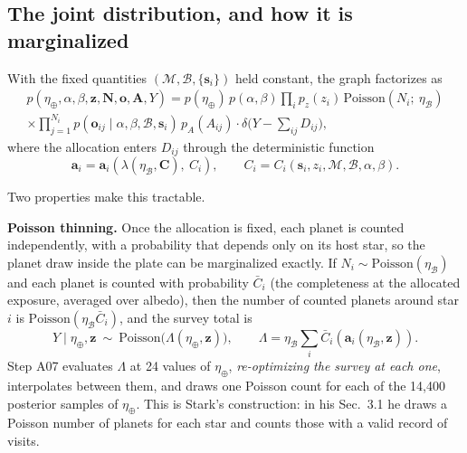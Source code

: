 \documentclass[11pt,a4paper]{article}
\begin{document}
\subsection{The joint distribution, and how it is marginalized}
\label{sec:joint}

With the fixed quantities $(\mathcal{M}, \mathcal{B}, \{\mathbf{s}_i\})$ held constant, the graph
factorizes as
\begin{multline}
p(\eta_\oplus, \alpha, \beta, \mathbf{z}, \mathbf{N}, \mathbf{o}, \mathbf{A}, Y)
= p(\eta_\oplus)\,p(\alpha,\beta)\prod_{i} p_z(z_i)\,
\mathrm{Poisson}\!\left(N_i;\ \eta_\mathcal{B}\right) \\
\times \prod_{j=1}^{N_i} p(\mathbf{o}_{ij} \mid \alpha, \beta, \mathcal{B}, \mathbf{s}_i)\,p_A(A_{ij})
\cdot \delta\!\Big(Y - \sum_{ij} D_{ij}\Big),
\label{eq:joint}
\end{multline}
where the allocation enters $D_{ij}$ through the deterministic function
\begin{equation}
\mathbf{a}_i = \mathbf{a}_i\!\left(\lambda(\eta_\mathcal{B}, \mathbf{C}),\ C_i\right),
\qquad C_i = C_i(\mathbf{s}_i, z_i, \mathcal{M}, \mathcal{B}, \alpha, \beta).
\label{eq:alloc}
\end{equation}

Two properties make this tractable.

\textbf{Poisson thinning.} Once the allocation is fixed, each planet is counted independently,
with a probability that depends only on its host star, so the planet draw inside the plate can be
marginalized exactly. If $N_i \sim \mathrm{Poisson}(\eta_\mathcal{B})$ and each planet is counted
with probability $\bar{C}_i$ (the completeness at the allocated exposure, averaged over albedo),
then the number of counted planets around star $i$ is
$\mathrm{Poisson}(\eta_\mathcal{B}\bar{C}_i)$, and the survey total is
\begin{equation}
Y \mid \eta_\oplus, \mathbf{z} \ \sim\ \mathrm{Poisson}\!\Big(\Lambda(\eta_\oplus, \mathbf{z})\Big),
\qquad
\Lambda = \eta_\mathcal{B} \sum_i \bar{C}_i\!\left(\mathbf{a}_i(\eta_\mathcal{B}, \mathbf{z})\right).
\label{eq:thinning}
\end{equation}
Step A07 evaluates $\Lambda$ at 24 values of $\eta_\oplus$, \emph{re-optimizing the survey at
each one}, interpolates between them, and draws one Poisson count for each of the 14,400
posterior samples of $\eta_\oplus$. This is Stark's construction: in his Sec.~3.1 he draws a
Poisson number of planets for each star and counts those with a valid record of visits.
\end{document}
